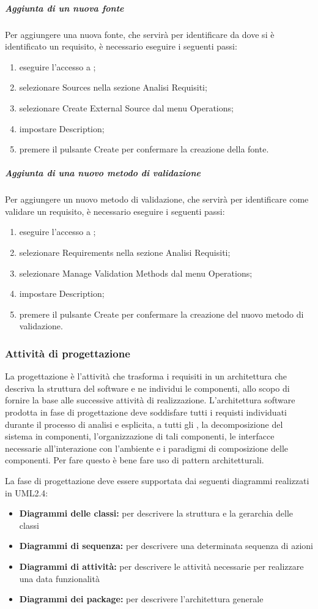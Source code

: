 \documentclass[12pt,a4paper]{article}
\begin{document}
\subparagraph{Aggiunta di un nuova fonte}
Per aggiungere una nuova fonte, che servirà per identificare da dove si è identificato un requisito, è necessario eseguire i seguenti passi: 
\begin{enumerate}
	\item eseguire l'accesso a ;
	\item selezionare Sources nella sezione Analisi Requisiti;
	\item selezionare Create External Source dal menu Operations;
	\item impostare Description; 
	\item premere il pulsante Create per confermare la creazione della fonte.
\end{enumerate}

\subparagraph{Aggiunta di una nuovo metodo di validazione}
Per aggiungere un nuovo metodo di validazione, che servirà per identificare come validare un requisito, è necessario eseguire i seguenti passi: 
\begin{enumerate}
	\item eseguire l'accesso a ;
	\item selezionare Requirements nella sezione Analisi Requisiti;
	\item selezionare Manage Validation Methods dal menu Operations;
	\item impostare Description; 
	\item premere il pulsante Create per confermare la creazione del nuovo metodo di validazione.
\end{enumerate}

\subsubsection{Attività di progettazione}
La progettazione è l'attività che trasforma i requisiti in un architettura che descriva la struttura del software e ne individui le componenti, allo scopo di fornire la base alle successive attività di realizzazione. L'architettura software prodotta in fase di progettazione deve soddisfare tutti i requisti individuati durante il processo di analisi e esplicita, a tutti gli , la decomposizione del sistema in componenti, l'organizzazione di tali componenti, le interfacce necessarie all'interazione con l'ambiente e i paradigmi di composizione delle componenti. Per fare questo è bene fare uso di pattern architetturali.

La fase di progettazione deve essere supportata dai seguenti diagrammi realizzati in UML2.4:
\begin{itemize}
	\item \textbf{Diagrammi delle classi:} per descrivere la struttura e la gerarchia delle classi
	\item \textbf{Diagrammi di sequenza:} per descrivere una determinata sequenza di azioni
	\item \textbf{Diagrammi di attività:} per descrivere le attività necessarie per realizzare una data funzionalità
	\item \textbf{Diagrammi dei package:} per descrivere l'architettura generale
\end{itemize}
\end{document}
